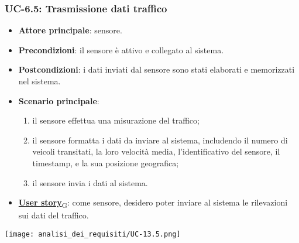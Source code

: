\subsubsection{UC-6.5: Trasmissione dati traffico}
\begin{itemize}
	\item \textbf{Attore principale}: sensore.
	\item \textbf{Precondizioni}: il sensore è attivo e collegato al sistema.
	\item \textbf{Postcondizioni}: i dati inviati dal sensore sono stati elaborati e memorizzati nel sistema.
	\item \textbf{Scenario principale}:
	      \begin{enumerate}
		      \item il sensore effettua una misurazione del traffico;
		      \item il sensore formatta i dati da inviare al sistema, includendo il numero di veicoli transitati, la loro velocità media, l'identificativo del sensore,
		            il timestamp, e la sua posizione geografica;
		      \item il sensore invia i dati al sistema.
	      \end{enumerate}
	\item \href{https://7last.github.io/docs/pb/documentazione-interna/glossario\#user-story}{\textbf{User story}\textsubscript{G}}:
	      come sensore, desidero poter inviare al sistema le rilevazioni sui dati del traffico.
\end{itemize}

\begin{center}
	\texttt{[image: analisi\_dei\_requisiti/UC-13.5.png]}
\end{center}

